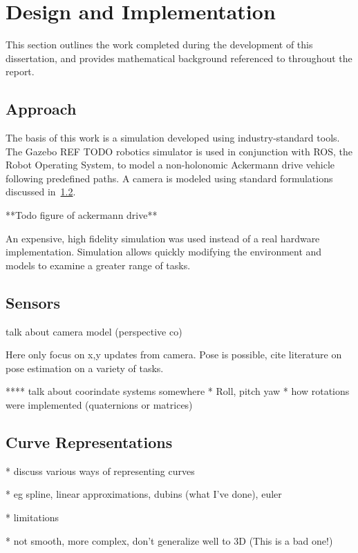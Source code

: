 \documentclass[a4paper,12pt,twoside,openright]{report}
\begin{document}
\chapter{Design and Implementation}
\label{chap:impl}

This section outlines the work completed during the development
of this dissertation, and provides mathematical background
referenced to throughout the report.

\section{Approach}

The basis of this work is a simulation developed using industry-standard tools.
The Gazebo REF TODO robotics simulator is used in conjunction with ROS,
the Robot Operating System, to model a non-holonomic Ackermann drive vehicle
following predefined paths. A camera is modeled using standard formulations
discussed in~\ref{impl:sensors}.

**Todo figure of ackermann drive**

An expensive, high fidelity simulation was used instead of a real hardware
implementation. Simulation allows quickly modifying the environment
and models to examine a greater range of tasks.



\section{Sensors}
\label{impl:sensors}

talk about camera model (perspective  co)


Here only focus on x,y updates from camera. Pose is possible, cite literature on pose estimation
on a variety of tasks. 

**** talk about coorindate systems somewhere
* Roll, pitch yaw
* how rotations were implemented (quaternions or matrices)

\section{Curve Representations}

* discuss various ways of representing curves

* eg spline, linear approximations, dubins (what I've done), euler

* limitations

  * not smooth, more complex, don't generalize well to 3D (This is a bad one!)
\end{document}
